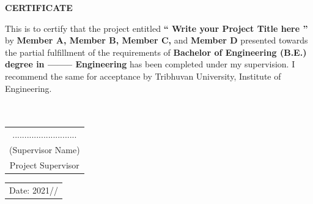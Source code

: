 \documentclass[a4paper, 12pt ]{report}
\begin{document}
	
	\newpage
	\cleardoublepage
	\setcounter{page}{2}
	\begin{center}\fontsize{18}{0} \textbf{CERTIFICATE}\end{center}
	\vspace*{\baselineskip}
	{\normalsize This is to certify that the project entitled {\bf `` Write your Project Title here ”}  by {\bf Member A, Member B, Member C,} and {\bf Member D} presented towards the partial fulfillment of the requirements of {\bf Bachelor of Engineering (B.E.) degree in -------- Engineering } has been completed under my supervision. I recommend the same for acceptance by Tribhuvan University, Institute of Engineering. }
	\\
	\\
	\\
	{\normalsize \begin{flushright}
			\begin{tabular}{ c }
				........................... \\ 
				(Supervisor Name)  \\  
				Project Supervisor      
			\end{tabular}
			
	\end{flushright}}
	{\normalsize \begin{flushleft}
			\begin{tabular}{ c }
				Date: 2021/\hspace{15pt}/   
			\end{tabular}
			
	\end{flushleft}}

	\pagebreak
	
	
\end{document}
